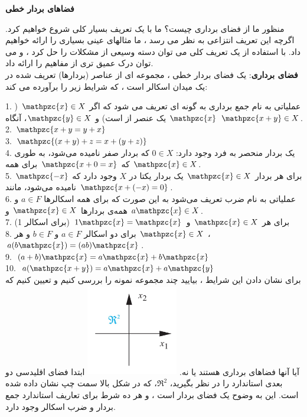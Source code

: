 \documentclass[a4paper,12pt]{report}
\begin{document}
	\noindent\textbf{\Large{فضاهای بردار خطی}}
	
	منظور ما از فضای برداری چیست؟ ما با یک تعریف بسیار کلی شروع خواهیم کرد. اگرچه این تعریف انتزاعی به نظر می رسد ، ما مثالهای عینی بسیاری را ارائه خواهیم داد. با استفاده از یک تعریف کلی می توان دسته وسیعی از مشکلات را حل کرد ، و می توان درک عمیق تری از مفاهیم را ارائه داد.\\
	
	\textbf{فضای برداری}: یک فضای بردار خطی ، مجموعه ای از عناصر (بردارها) تعریف شده در یک میدان اسکالر است ، که شرایط زیر را برآورده می کند:
	
	1.	عملیاتی به نام جمع برداری به گونه ای تعریف می شود که اگر
	 $ \mathpzc{x} \in X $ ($ \mathpzc{x} $
	  یک عنصر از  است) و
	   $ \mathpzc{y} \in X $،
	    آنگاه 
	    $ \mathpzc{x+y} \in X $.\\
	
	2. $ \mathpzc{x+y=y+x} $\\
	
	3. $ \mathpzc{(x+y)+z=x+(y+z)} $\\
	
	4.	یک بردار منحصر به فرد وجود دارد:
	 $ 0 \in X $
	  که بردار صفر نامیده می‌شود، به طوری که
	 $ \mathpzc{x+0=x} $ 
	   برای همه
	 $ \mathpzc{x} \in X $.\\
	
	5. برای هر بردار 
	$ \mathpzc{x} \in X $
	 یک بردار یکتا در $ X $ وجود دارد که
	$ \mathpzc{-x} $
	 نامیده می‌شود، مانند 
	$ \mathpzc{x+(-x)=0} $.\\
	
	6. عملیاتی به نام ضرب تعریف می‌شود به این صورت که برای همه اسکالرها 
	$ a \in F $
	 و همه‌ی بردارها
	$ \mathpzc{x} \in X $ و $ a\mathpzc{x} \in X $.\\
	
	7. برای هر 
	$ \mathpzc{x} \in X $
	و
	$ 1\mathpzc{x}=\mathpzc{x} $
	 (برای اسکالر 1)\\
	
	8. برای دو اسکالر $ a \in F $ و $ b \in F $ و هر 
	$ \mathpzc{x} \in X $ ، $ a(b\mathpzc{x})=(ab)\mathpzc{x} $.\\
	
	9. $ (a+b)\mathpzc{x}=a\mathpzc{x}+b\mathpzc{x} $\\
	
	10. $ a(\mathpzc{x+y}) = a\mathpzc{x}+a\mathpzc{y} $\\
	
	برای نشان دادن این شرایط ، بیایید چند مجموعه نمونه را بررسی کنیم و تعیین کنیم که آیا آنها فضاهای برداری هستند یا نه. 
	\marginpar
	{
		\includegraphics[width=4cm, height=4cm]{124-1}	
	}
	ابتدا فضای اقلیدسی دو بعدی استاندارد را در نظر بگیرید، $ \Re^2 $، که در شکل بالا سمت چپ نشان داده شده است. این به وضوح یک فضای بردار است ، و هر ده شرط برای تعاریف استاندارد جمع بردار و ضرب اسکالر وجود دارد.\\
	
\end{document}
